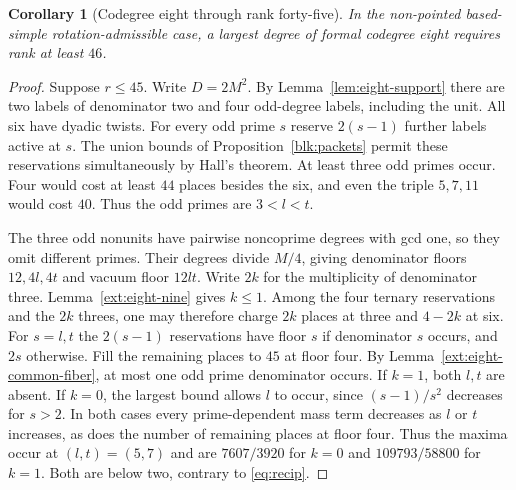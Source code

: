 \documentclass[11pt]{amsart}
\numberwithin{equation}{section}
\newtheorem{corollary}[theorem]{Corollary}
\theoremstyle{definition}
\theoremstyle{plain}
\begin{document}
\begin{corollary}[Codegree eight through rank forty-five]\label{round:eight-rank}
In the non-pointed based-simple rotation-admissible case, a largest
degree of formal codegree eight requires rank at least $46$.
\end{corollary}
\begin{proof}
Suppose $r\le45$. Write $D=2M^2$. By Lemma~\ref{lem:eight-support}
there are two labels of denominator two and four odd-degree labels,
including the unit. All six have dyadic twists. For every odd prime $s$
reserve $2(s-1)$ further labels active at $s$. The union bounds of
Proposition~\ref{blk:packets} permit these reservations simultaneously
by Hall's theorem. At least three odd primes occur. Four would cost
at least $44$ places besides the six, and even the triple $5,7,11$
would cost $40$. Thus the odd primes are $3<l<t$.

The three odd nonunits have pairwise noncoprime degrees with gcd one,
so they omit different primes. Their degrees divide $M/4$, giving
denominator floors $12,4l,4t$ and vacuum floor $12lt$. Write $2k$ for
the multiplicity of denominator three. Lemma~\ref{ext:eight-nine}
gives $k\le1$. Among the four ternary reservations and the $2k$ threes,
one may therefore charge $2k$ places at three and $4-2k$ at six.
For $s=l,t$ the $2(s-1)$ reservations have floor $s$ if denominator
$s$ occurs, and $2s$ otherwise. Fill the remaining places to $45$ at
floor four. By Lemma~\ref{ext:eight-common-fiber}, at most one odd
prime denominator occurs. If $k=1$, both $l,t$ are absent. If $k=0$,
the largest bound allows $l$ to occur, since $(s-1)/s^2$ decreases
for $s>2$. In both cases every prime-dependent mass term decreases
as $l$ or $t$ increases, as does the number of remaining places at
floor four. Thus the maxima occur at $(l,t)=(5,7)$ and are
$7607/3920$ for $k=0$ and $109793/58800$ for $k=1$.
Both are below two, contrary to \eqref{eq:recip}.
\end{proof}
\end{document}
